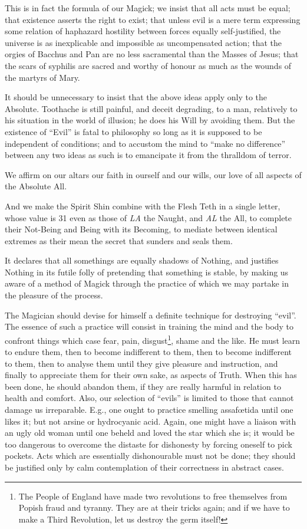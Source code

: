 This is in fact the formula of our Magick; we insist that all acts must be equal; that existence asserts the right to exist; that unless evil is a mere term expressing some relation of haphazard hostility between forces equally self-justified, the universe is as inexplicable and impossible as uncompensated action; that the orgies of Bacchus and Pan are no less sacramental than the Masses of Jesus; that the scars of syphilis are sacred and worthy of honour as much as the wounds of the martyrs of Mary.

It should be unnecessary to insist that the above ideas apply only to the Absolute. Toothache is still painful, and deceit degrading, to a man, relatively to his situation in the world of illusion; he does his Will by avoiding them. But the existence of \enquote{Evil} is fatal to philosophy so long as it is supposed to be independent of conditions; and to accustom the mind to \enquote{make no difference} between any two ideas as such is to emancipate it from the thralldom of terror.

We affirm on our altars our faith in ourself and our wills, our love of all aspects of the Absolute All.

And we make the Spirit Shin combine with the Flesh Teth in a single letter, whose value is 31 even as those of \textit{LA} the Naught, and \textit{AL} the All, to complete their Not-Being and Being with its Becoming, to mediate between identical extremes as their mean \textemdash{} the secret that sunders and seals them.

It declares that all somethings are equally shadows of Nothing, and justifies Nothing in its futile folly of pretending that something is stable, by making us aware of a method of Magick through the practice of which we may partake in the pleasure of the process.

The Magician should devise for himself a definite technique for destroying \enquote{evil}. The essence of such a practice will consist in training the mind and the body to confront things which case fear, pain, disgust\footnote{The People of England have made two revolutions to free themselves from Popish fraud and tyranny. They are at their tricks again; and if we have to make a Third Revolution, let us destroy the germ itself!}, shame and the like. He must learn to endure them, then to become indifferent to them, then to become indifferent to them, then to analyse them until they give pleasure and instruction, and finally to appreciate them for their own sake, as aspects of Truth. When this has been done, he should abandon them, if they are really harmful in relation to health and comfort. Also, our selection of \enquote{evils} is limited to those that cannot damage us irreparable. E.g., one ought to practice smelling assaf\oe{}tida until one likes it; but not arsine or hydrocyanic acid. Again, one might have a liaison with an ugly old woman until one beheld and loved the star which she is; it would be too dangerous to overcome the distaste for dishonesty by forcing oneself to pick pockets. Acts which are essentially dishonourable must not be done; they should be justified only by calm contemplation of their correctness in abstract cases.

